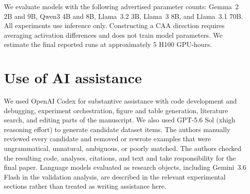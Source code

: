 \documentclass{article}
\begin{document}
We evaluate models with the following advertised parameter counts: Gemma~2 2B
and 9B, Qwen3 4B and 8B, Llama~3.2 3B, Llama~3 8B, and Llama~3.1 70B. All
experiments use inference only. Constructing a CAA direction requires averaging
activation differences and does not train model parameters. We estimate the
final reported runs at approximately 5 H100 GPU-hours.

\section{Use of AI assistance}
\label{app:ai-assistance}

We used OpenAI Codex for substantive assistance with code development and
debugging, experiment orchestration, figure and table generation, literature
search, and editing parts of the manuscript. We also used GPT-5.6 Sol (xhigh reasoning effort) to
generate candidate dataset items. The authors manually reviewed every candidate
and removed or rewrote examples that were ungrammatical, unnatural, ambiguous,
or poorly matched. The authors checked the resulting code, analyses, citations,
and text and take responsibility for the final paper. Language models evaluated
as research objects, including Gemini~3.6 Flash in the validation analysis, are
described in the relevant experimental sections rather than treated as writing
assistance here.
\end{document}
